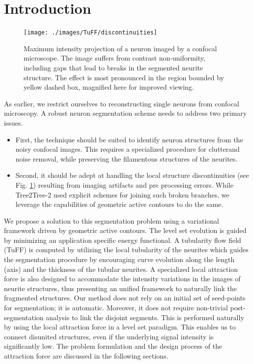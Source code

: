 \section{Introduction}
\begin{figure}[t]
\centering
\texttt{[image: ./images/TuFF/discontinuities]}
\caption[Gaps in neuron structures]{Maximum intensity projection of a neuron imaged by a confocal microscope. The image suffers from contrast non-uniformity, including gaps that lead to breaks in the segmented neurite structure. The effect is most pronounced in the region bounded by yellow dashed box, magnified here for improved viewing.}
\label{fig:discontinuities}
\end{figure}
As earlier, we restrict ourselves to reconstructing single neurons from  confocal microscopy. A robust neuron segmentation scheme needs to address two primary issues. 
\begin{itemize}
\item First, the technique should  be suited to identify neuron structures from the noisy confocal images. This requires a specialized procedure for clutterand noise removal, while preserving the filamentous structures of the neurites. 
\item Second, it should be adept at handling the local structure discontinuities (see Fig. \ref{fig:discontinuities}) resulting from imaging artifacts and pre processing errors. While Tree2Tree-2 used explicit schemes for joining such broken branches, we leverage the capabilities of geometric active contours to do the same.
\end{itemize}
We propose a solution to this segmentation problem using a variational framework driven by geometric active contours. The level set evolution is guided by minimizing an application specific energy functional. A tubularity flow field (TuFF) is computed by utilizing the local tubularity of the neurites which guides the segmentation procedure by encouraging curve evolution along the length (axis) and the thickness of the tubular neurites. A specialized local attraction force is also designed to accommodate the intensity variations in the images of neurite structures, thus presenting an unified framework to naturally link the fragmented structures. Our method does not rely on an initial set of seed-points for segmentation; it is automatic. Moreover, it does not require non-trivial post-segmentation analysis to link the disjoint segments. This is performed naturally by using the local attraction force in a level set paradigm. This enables us to connect disunited structures, even if the underlying signal intensity is significantly low. The problem  formulation and the design process of the attraction force are discussed in the following sections. 

